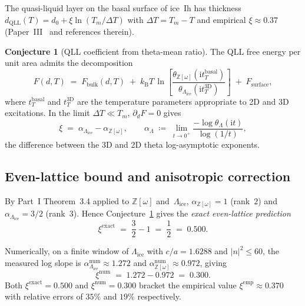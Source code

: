 \documentclass[11pt,letterpaper]{article}
\theoremstyle{plain}
\theoremstyle{definition}
\newtheorem{conjecture}[theorem]{Conjecture}
\newcommand{\Eisenstein}{\mathbb{Z}[\omega]}
\newcommand{\IceLat}{\Lambda_{\text{ice}}}
\newcommand{\Lat}{\Lambda}
\newcommand{\kB}{k_{\mathrm{B}}}
\begin{document}
The quasi-liquid layer on the basal surface of ice~Ih has thickness
$d_{\text{QLL}}(T) = d_0 + \xi \ln(T_m/\Delta T)$ with $\Delta T
= T_m - T$ and empirical $\xi\approx 0.37$
(Paper~III~\cite{MamounPaperIII} and references therein).

\begin{conjecture}[QLL coefficient from theta-mean ratio]\label{conj:xi}
The QLL free energy per unit area admits the decomposition
\begin{equation}\label{eq:qll-decomp}
  F(d,T) \;=\; F_{\text{bulk}}(d,T)
  \;+\; \kB T\,\ln\!\left[\frac{\theta_{\Eisenstein}(\mathrm{i} t_T^{\text{basal}})}
                                  {\theta_{\IceLat}(\mathrm{i} t_T^{\text{3D}})}\right]
  \;+\; F_{\text{surface}},
\end{equation}
where $t_T^{\text{basal}}$ and $t_T^{\text{3D}}$ are the
temperature parameters appropriate to 2D and 3D excitations.  In the
limit $\Delta T\ll T_m$, $\partial_d F = 0$ gives
\begin{equation}\label{eq:xi-pred}
  \xi \;=\; \alpha_{\IceLat} - \alpha_{\Eisenstein},
  \qquad
  \alpha_\Lat \;\coloneqq\; \lim_{t\to 0^+}
  \frac{-\log\theta_\Lat(\mathrm{i} t)}{\log(1/t)},
\end{equation}
the difference between the 3D and 2D theta log-asymptotic
exponents.
\end{conjecture}

\subsection{Even-lattice bound and anisotropic correction}

By Part~I Theorem~3.4 applied to $\Eisenstein$ and~$\IceLat$,
$\alpha_{\Eisenstein}=1$ (rank~$2$) and
$\alpha_{\IceLat}=3/2$ (rank~$3$).  Hence
Conjecture~\ref{conj:xi} gives the \emph{exact even-lattice
prediction}
\begin{equation}\label{eq:xi-exact}
  \xi^{\text{exact}} \;=\; \frac{3}{2} - 1 \;=\; \frac{1}{2} \;=\;
  0.500.
\end{equation}

Numerically, on a finite window of $\IceLat$ with $c/a=1.6288$ and
$|n|^2\le 60$, the measured log slope is $\alpha^{\text{num}}_{\IceLat}
\approx 1.272$ and $\alpha^{\text{num}}_{\Eisenstein}\approx 0.972$,
giving
\begin{equation}\label{eq:xi-measured}
  \xi^{\text{num}} \;=\; 1.272 - 0.972 \;=\; 0.300.
\end{equation}
Both $\xi^{\text{exact}}=0.500$ and $\xi^{\text{num}}=0.300$ bracket
the empirical value $\xi^{\text{emp}}\approx 0.370$ with relative
errors of $35\%$ and $19\%$ respectively.
\end{document}
